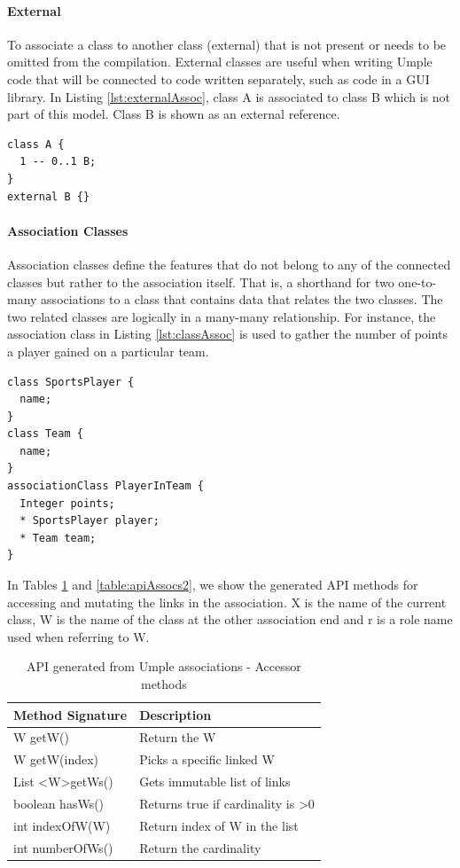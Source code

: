 \paragraph*{External}  
To associate a class to another class (external) that is not present or needs to be omitted from the compilation. External classes are useful when writing Umple code that will be connected to code written separately, such as code in a GUI library.
In Listing \ref{lst:externalAssoc}, class A is associated to class B which is not part of this model. Class B is shown as an external reference.
\begin{lstlisting}[style=umplePlainNumbers, caption=External associations,label=lst:externalAssoc]
class A {  
  1 -- 0..1 B; 
}  
external B {}
\end{lstlisting}

\paragraph*{Association Classes}
Association classes \cite{UMLSpec} define the features that do not belong to any of the connected classes but rather to the association itself. That is, a  shorthand for two one-to-many associations to a class that contains data that relates the two classes. The two related classes are logically in a many-many relationship. For instance, the association class in Listing \ref{lst:classAssoc} is used to gather the number of points a player gained on a particular team. 
\begin{lstlisting}[style=umplePlainNumbers, caption=An association class,label=lst:classAssoc]
class SportsPlayer {
  name;
}
class Team {
  name;
}
associationClass PlayerInTeam {
  Integer points;
  * SportsPlayer player;
  * Team team;
}
\end{lstlisting}

In Tables \ref{table:apiAssocs1} and \ref{table:apiAssocs2}, we show the generated API methods for accessing and mutating the links in the association. X is the name of the current class, W is the name of the class at the other association end and r is a role name used when referring to W.

\begin{table}[h]
\centering
\caption{API generated from Umple associations - Accessor methods \cite{UmpleAPI}}
\label{table:apiAssocs1}
\begin{tabular}{l|l}
\toprule
\rowcolor[HTML]{BBDAFF}
\textbf{Method Signature} & \textbf{Description}     \\ \midrule
W getW() & Return the W  \\ 
W getW(index) &	Picks a specific linked W  \\ 
List \textless W\textgreater getWs() & Gets immutable list of links  \\ 
boolean hasWs() & Returns true if cardinality is \textgreater  0 \\ 
int indexOfW(W)	 & Return index of W in the list\\ 
int numberOfWs() & Return the cardinality \\ 
\bottomrule
\end{tabular}
\end{table}

